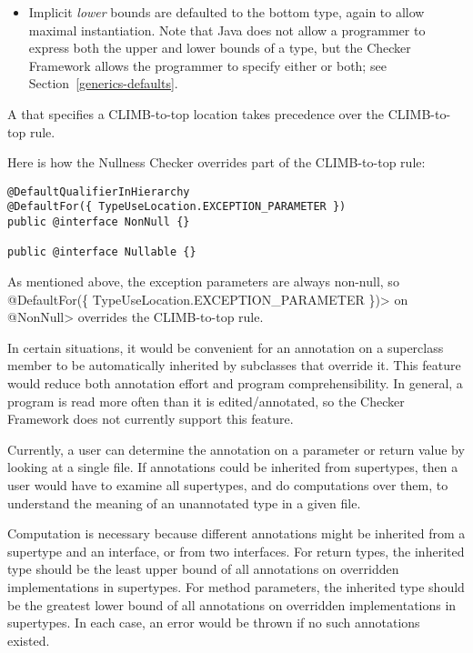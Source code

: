 \begin{itemize}
\item
Implicit \emph{lower} bounds are defaulted to the bottom type, again to allow
maximal instantiation.  Note that Java does not allow a programmer to
express both the upper and lower bounds of a type, but the Checker
Framework allows the programmer to specify either or both;
see Section~\ref{generics-defaults}.

\end{itemize}

A  that specifies a
CLIMB-to-top location takes precedence over the CLIMB-to-top rule.

Here is how the Nullness Checker overrides part of the CLIMB-to-top rule:

\begin{Verbatim}
@DefaultQualifierInHierarchy
@DefaultFor({ TypeUseLocation.EXCEPTION_PARAMETER })
public @interface NonNull {}

public @interface Nullable {}
\end{Verbatim}

\noindent
 As mentioned above, the exception parameters are always non-null, so
\<@DefaultFor(\{ TypeUseLocation.EXCEPTION\_PARAMETER \})> on \<@NonNull> overrides
the CLIMB-to-top rule.



In certain situations, it would be convenient for an annotation on a
superclass member to be automatically inherited by subclasses that override
it.  This feature would reduce both annotation effort and program
comprehensibility.  In general, a program is read more often than it is
edited/annotated, so the Checker Framework does not currently support this
feature.

Currently, a user can determine the annotation on a parameter or return
value by looking at a single file.  If annotations could be inherited from
supertypes, then a user would have to examine all supertypes, and do
computations over them, to understand the meaning of an unannotated type in
a given file.

Computation is necessary because different annotations might be inherited
from a supertype and an interface, or from two interfaces.  For return
types, the inherited type should be the least upper bound of all
annotations on overridden implementations in supertypes.  For method
parameters, the inherited type should be the greatest lower bound of all
annotations on overridden implementations in supertypes.  In each case, an
error would be thrown if no such annotations existed.

